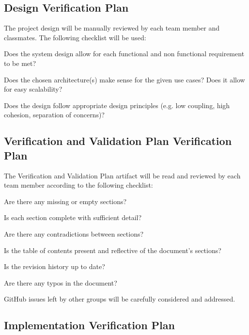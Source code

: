 \documentclass[12pt, titlepage]{article}
\begin{document}
	\subsection{Design Verification Plan}

	The project design will be manually reviewed by each team member and classmates. The following checklist will be used:
	\begin{todolist}
		\item Does the system design allow for each functional and non functional requirement to be met?
		\item Does the chosen architecture(s) make sense for the given use cases? Does it allow for easy scalability?
		\item Does the design follow appropriate design principles (e.g. low coupling, high cohesion, separation of concerns)?
	\end{todolist}
	
	\subsection{Verification and Validation Plan Verification Plan}

	The Verification and Validation Plan artifact will be read and reviewed by each team member according to the following checklist:
	\begin{todolist}
		\item Are there any missing or empty sections?
		\item Is each section complete with sufficient detail?
		\item Are there any contradictions between sections?
		\item Is the table of contents present and reflective of the document's sections?
		\item Is the revision history up to date?
		\item Are there any typos in the document?
	\end{todolist}
	GitHub issues left by other groups will be carefully considered and addressed.
	
	\subsection{Implementation Verification Plan}
	
\end{document}

